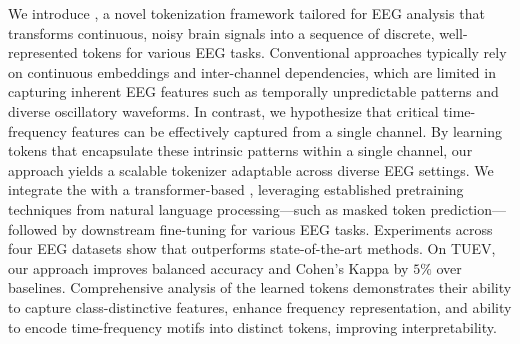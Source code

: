 
We introduce \tokenizer, a novel tokenization framework tailored for EEG analysis that transforms continuous, noisy brain signals into a sequence of discrete, well-represented tokens for various EEG tasks. Conventional approaches typically rely on continuous embeddings and inter-channel dependencies, which are limited in capturing inherent EEG features such as temporally unpredictable patterns and diverse oscillatory waveforms. In contrast, we hypothesize that critical time-frequency features can be effectively captured from a single channel. By learning tokens that encapsulate these intrinsic patterns within a single channel, our approach yields a scalable tokenizer adaptable across diverse EEG settings. We integrate the \tokenizer with a transformer-based \encoder, leveraging established pretraining techniques from natural language processing—such as masked token prediction—followed by downstream fine-tuning for various EEG tasks. Experiments across four EEG datasets show that \method outperforms state-of-the-art methods. On TUEV, our approach improves balanced accuracy and Cohen's Kappa by $5\%$ over baselines. Comprehensive analysis of the learned tokens demonstrates their ability to capture class-distinctive features, enhance frequency representation, and ability to encode time-frequency motifs into distinct tokens, improving interpretability. 



% 




